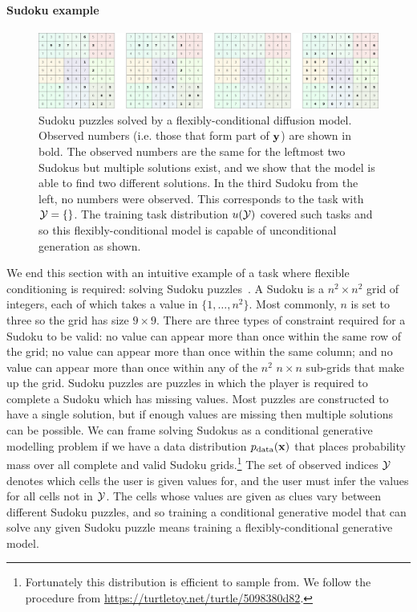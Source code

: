 \paragraph{Sudoku example}
\begin{figure}[t]
    \centering
    \includegraphics[width=\textwidth]{figs/thesis/sudoku_panel.pdf}
    \caption{Sudoku puzzles solved by a flexibly-conditional diffusion model. Observed numbers (i.e. those that form part of ${\mathbf{y}}$) are shown in bold. The observed numbers are the same for the leftmost two Sudokus but multiple solutions exist, and we show that the model is able to find two different solutions. In the third Sudoku from the left, no numbers were observed. This corresponds to the task with ${\mathcal{Y}} = \{\}$. The training task distribution $u({\mathcal{Y}})$ covered such tasks and so this flexibly-conditional model is capable of unconditional generation as shown. }
    \label{fig:sudoku-panel}
\end{figure}
We end this section with an intuitive example of a task where flexible conditioning is required: solving Sudoku puzzles~\citep{weilbach2023graphically}. A Sudoku is a $n^2 \times n^2$ grid of integers, each of which takes a value in $\{1,\ldots,n^2\}$. Most commonly, $n$ is set to three so the grid has size $9 \times 9$. There are three types of constraint required for a Sudoku to be valid: no value can appear more than once within the same row of the grid; no value can appear more than once within the same column; and no value can appear more than once within any of the $n^2$ $n \times n$ sub-grids that make up the grid. Sudoku puzzles are puzzles in which the player is required to complete a Sudoku which has missing values. Most puzzles are constructed to have a single solution, but if enough values are missing then multiple solutions can be possible. We can frame solving Sudokus as a conditional generative modelling problem if we have a data distribution $p_{\rm{data}}({\mathbf{x}})$ that places probability mass over all complete and valid Sudoku grids.\footnote{Fortunately this distribution is efficient to sample from. We follow the procedure from \url{https://turtletoy.net/turtle/5098380d82}.} The set of observed indices ${\mathcal{Y}}$ denotes which cells the user is given values for, and the user must infer the values for all cells not in ${\mathcal{Y}}$. The cells whose values are given as clues vary between different Sudoku puzzles, and so training a conditional generative model that can solve any given Sudoku puzzle means training a flexibly-conditional generative model. 

